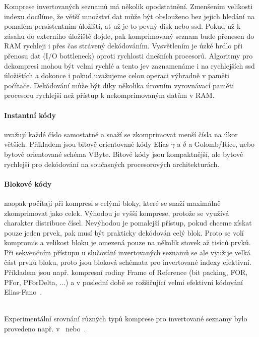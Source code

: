 \documentclass[11pt,letterpaper,oneside,openright]{book}
\begin{document}
Komprese invertovaných seznamů má několik opodstatnění. Zmenšením velikosti
indexu docílíme, že větší množství dat může být obslouženo bez jejich hledání
na pomalém persistentním úložišti, ať už je to pevný disk nebo ssd. Pokud už k
zásahu do externího úložiště dojde, pak komprimovaný seznam bude přenesen do
RAM rychleji i přes čas strávený dekódováním. Vysvětlením je úzké hrdlo při
přenosu dat (I/O bottleneck) oproti rychlosti dnešních procesorů. Algoritmy pro
dekompresi mohou být velmi rychlé a tento jev zaznamenáme i na rychlejších ssd
úložištích a dokonce i pokud uvažujeme celou operaci výhradně v paměti
počítače. Dekódování může být díky několika úrovním vyrovnávací paměti
procesoru rychlejší než přístup k nekomprimovaným datům v RAM.

\paragraph{Instantní kódy} uvažují každé číslo samostatně a snaží se
zkomprimovat menší čísla na úkor větších. Příkladem jsou bitově orientované
kódy Elias $\gamma$ a $\delta$ a Golomb/Rice, nebo bytově orientované schéma
VByte. Bitové kódy jsou kompaktnější, ale bytové rychlejší pro dekódování na
současných procesorových architekturách.

\paragraph{Blokové kódy} naopak počítají při kompresi s celými bloky, které se
snaží maximálně zkomprimovat jako celek. Výhodou je vyšší komprese, protože se
využívá charakter distribuce čísel. Nevýhodou je pomalejší přístup, pokud
chceme získat pouze jeden prvek, pak musí být prakticky dekódován celý blok.
Proto se volí kompromis a velikost bloku je omezená pouze na několik stovek až
tisíců prvků. Při sekvenčním přístupu u slučování invertovaných seznamů se ale
využije velká část prvků bloku, proto jsou bloková schémata pro invertované
indexy efektivní. Příkladem jsou např. kompresní rodiny Frame of Reference (bit
packing, FOR, PFor, PForDelta, ...) a v poslední době se rožšiřující velmi
efektivní kódování
Elias-Fano~\cite{DBLP:journals/corr/abs-1206-4300,Curtiss:2013:USS:2536222.2536239}.

~\\
Experimentální srovnání různých typů komprese pro invertované seznamy bylo
provedeno např. v~\citep[addenda~6]{buttcher2010information}
nebo~\cite{Zhang:2008:PCI:1367497.1367550}.
\end{document}
